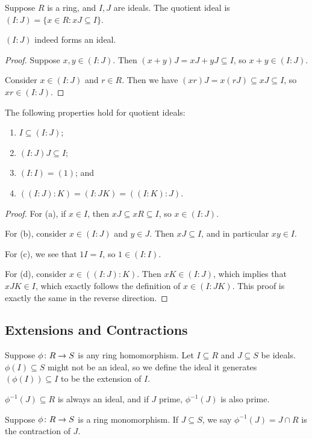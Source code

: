 \begin{definition}
    Suppose \(R\) is a ring, and \(I,J\) are ideals.
    The quotient ideal is \((I:J) = \{x \in R : xJ \subseteq I\}\).
\end{definition}
\begin{lemma}
    \((I:J)\) indeed forms an ideal.
\end{lemma}
\begin{proof}
    Suppose \(x,y \in (I:J)\).
    Then \((x+y)J = xJ + yJ \subseteq I\),
    so \(x+y \in (I:J)\).

    Consider \(x \in (I:J)\) and \(r \in R\).
    Then we have \((xr)J = x(rJ) \subseteq xJ \subseteq I\),
    so \(xr \in (I:J)\).
\end{proof}
\begin{proposition}
    The following properties hold for quotient ideals:
    \begin{enumerate}[label={(\alph*)}, itemsep=0mm]
        \item \(I \subseteq (I:J)\);
        \item \((I:J)J \subseteq I\);
        \item \((I:I) = (1)\); and
        \item \(((I:J):K) = (I:JK) = ((I:K):J)\).
    \end{enumerate}
\end{proposition}
\begin{proof}
    For (a), if \(x \in I\), then \(xJ \subseteq xR \subseteq I\),
    so \(x \in (I:J)\).

    For (b), consider \(x \in (I:J)\) and \(y \in J\).
    Then \(xJ \subseteq I\), and in particular \(xy \in I\).

    For (c), we see that \(1I = I\), so \(1 \in (I:I)\).

    For (d), consider \(x \in ((I:J):K)\).
    Then \(xK \in (I:J)\),
    which implies that \(xJK \in I\),
    which exactly follows the definition of \(x \in (I:JK)\).
    This proof is exactly the same in the reverse direction.
\end{proof}

\subsection*{Extensions and Contractions}

\begin{definition}
    Suppose \(\phi\colon R\to S\) is any ring homomorphism.
    Let \(I \subseteq R\) and \(J \subseteq S\) be ideals.
    \(\phi(I) \subseteq S\) might not be an ideal,
    so we define the ideal it generates \((\phi(I)) \subseteq I\)
    to be the extension of \(I\).
\end{definition}
\begin{remark}
    \(\phi^{-1}(J) \subseteq R\) is always an ideal,
    and if \(J\) prime, \(\phi^{-1}(J)\) is also prime.
\end{remark}
\begin{definition}
    Suppose \(\phi\colon R\to S\) is a ring monomorphism.
    If \(J \subseteq S\), we say \(\phi^{-1}(J) = J \cap R\) is the contraction of \(J\).
\end{definition}


